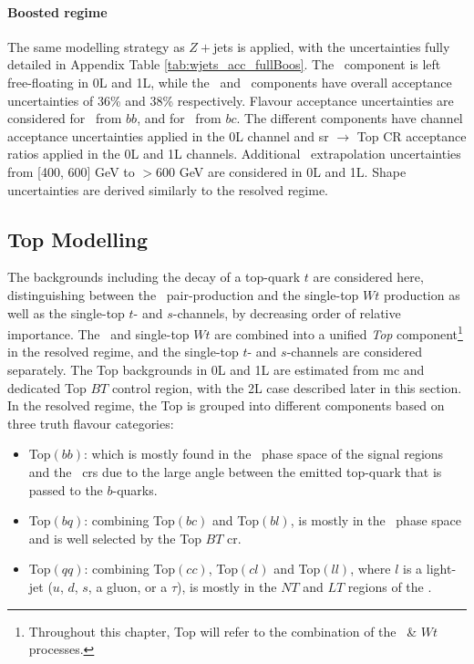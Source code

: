 \paragraph{Boosted regime} The same modelling strategy as $Z+$jets is applied, with the uncertainties fully detailed in Appendix Table \ref{tab:wjets_acc_fullBoos}. The \whf\ component is left free-floating in 0L and 1L, while the \wmf\ and \wlf\ components have overall acceptance uncertainties of 36\% and 38\% respectively. Flavour acceptance uncertainties are considered for \whf\ from $bb$, and for \wmf\ from $bc$. The different components have channel acceptance uncertainties applied in the 0L channel and \gls{sr} $\rightarrow$ Top CR acceptance ratios applied in the 0L and 1L channels. Additional \ptv\ extrapolation uncertainties from [400, 600] GeV to $> 600$ GeV are considered in 0L and 1L. Shape uncertainties are derived similarly to the resolved regime. 

\subsection{Top Modelling}\label{sec-modTop} 
The backgrounds including the decay of a top-quark $t$ are considered here, distinguishing between the \ttb\ pair-production and the single-top $Wt$ production as well as the single-top $t$- and $s$-channels, by decreasing order of relative importance. The \ttb\ and single-top $Wt$ are combined into a unified \textit{Top} component\footnote{Throughout this chapter, Top will refer to the combination of the \ttb\ \& $Wt$ processes.} in the resolved regime, and the single-top $t$- and $s$-channels are considered separately. The Top backgrounds in 0L and 1L are estimated from \gls{mc} and dedicated Top $BT$ control region, with the 2L case described later in this section. In the resolved regime, the Top is grouped into different components based on three truth flavour categories:
\begin{itemize}
    \item Top$(bb)$: which is mostly found in the \vhb\ phase space of the signal regions and the \highdr\ \glspl{cr} due to the large angle between the emitted top-quark that is passed to the $b$-quarks. 
    \item Top$(bq)$: combining Top$(bc)$ and Top$(bl)$, is mostly in the \vhc\ phase space and is well selected by the Top $BT$ \gls{cr}.
    \item Top$(qq)$: combining Top$(cc)$, Top$(cl)$ and Top$(ll)$, where $l$ is a light-jet ($u$, $d$, $s$, a gluon, or a $\tau$), is mostly in the $NT$ and $LT$ regions of the \vhc. 
\end{itemize}

